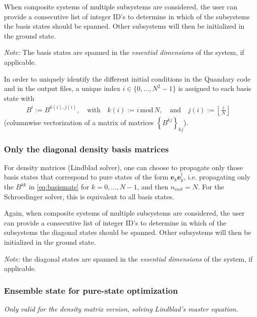 \documentclass[11pt]{article}
\begin{document}
When composite systems of multiple subsystems are considered, the user can provide a consecutive list of integer ID's to determine in which of the subsystems the basis states should be spanned. Other subsystems will then be initialized in the ground state.

\textit{Note:} The basis states are spanned in the \textit{essential dimensions} of the system, if applicable. 

In order to uniquely identify the different initial conditions in the Quandary code and in the output files, a
unique index $i \in \{0,\dots, N^2-1\}$ is assigned to each basis state with 
\begin{align*}
  B^i := B^{k(i), j(i)}, \quad \text{with} \quad k(i) := i \,\mbox{mod}\, N,
  \quad \text{and} \quad j(i) := \left\lfloor \frac{i}{N} \right\rfloor
\end{align*}
(columnwise vectorization of a matrix of matrices $\left\{B^{kj}\right\}_{kj}$). 



\subsubsection{Only the diagonal density basis matrices}

For density matrices (Lindblad solver), one can choose to propagate only those basis states that correspond to pure states of the form $\boldsymbol{e}_k\boldsymbol{e}_k^\dagger$, i.e. propagating only the $B^{kk}$ in \eqref{eq:basismats} for $k=0,\dots, N-1$, and then $n_{init}=N$. For the Schroedinger solver, this is equivalent to all basis states. 

Again, when composite systems of multiple subsystems are considered, the user can provide a consecutive list of integer ID's to determine in which of the subsystems the diagonal states should be spanned. Other subsystems will then be initialized in the ground state.

\textit{Note:} the diagonal states are spanned in the \textit{essential dimensions} of the system, if applicable. 



\subsubsection{Ensemble state for pure-state optimization}\label{sec:ensemblestate}
\textit{Only valid for the density matrix version, solving Lindblad's master equation.}
\end{document}
